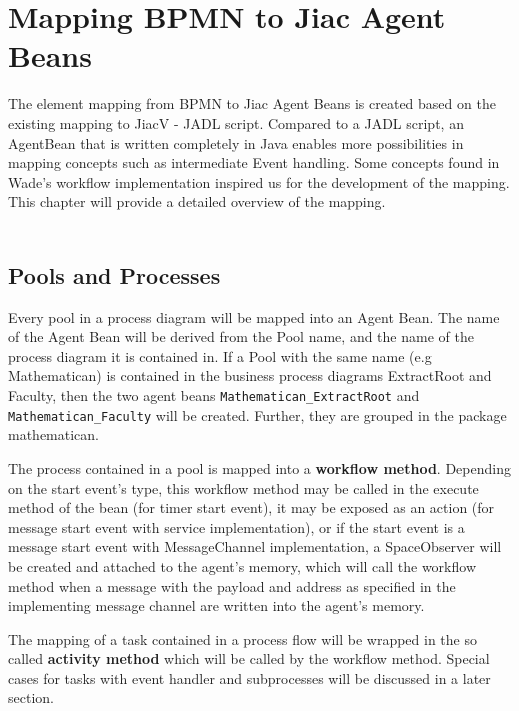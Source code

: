 \chapter{Mapping BPMN to Jiac Agent Beans}
\label{chap:mapping}
The element mapping from BPMN to Jiac Agent Beans is created based on the existing mapping to JiacV - JADL script. Compared to a JADL script, an AgentBean that is written completely in Java enables more possibilities in mapping concepts such as intermediate Event handling. Some concepts found in Wade's workflow implementation inspired us for the development of the mapping. This chapter will provide a detailed overview of the mapping.\\\\

\section{Pools and Processes}
Every pool in a process diagram will be mapped into an Agent Bean. The name of the Agent Bean will be derived from the Pool name, and the name of the process diagram it is contained in. If a Pool with the same name (e.g Mathematican) is contained in the business process diagrams ExtractRoot and Faculty, then the two agent beans \texttt{Mathematican\_ExtractRoot} and \texttt{Mathematican\_Faculty} will be created. Further, they are grouped in the package mathematican. 

The process contained in a pool is mapped into a \textbf{workflow method}. Depending on the start event's type, this workflow method may be called in the execute method of the bean (for timer start event), it may be exposed as an action (for message start event with service implementation), or if the start event is a message start event with MessageChannel implementation, a SpaceObserver will be created and attached to the agent's memory, which will call the workflow method when a message with the payload and address as specified in the implementing message channel are written into the agent's memory.

The mapping of a task contained in a process flow will be wrapped in the so called \textbf{activity method} which will be called by the workflow method. Special cases for tasks with event handler and subprocesses will be discussed in a later section.

